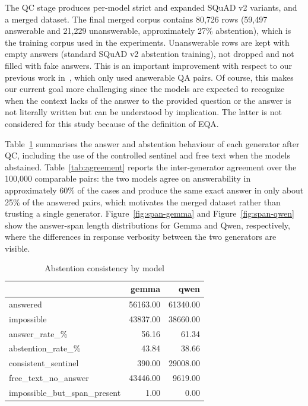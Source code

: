 \documentclass[graybox]{SNmult}
\begin{document}
The QC stage produces per-model strict and expanded SQuAD v2 variants, and a
merged dataset. The final merged corpus contains 80{,}726 rows (59{,}497
answerable and 21{,}229 unanswerable, approximately 27\% abstention), which is
the training corpus used in the experiments. Unanswerable rows are kept with
empty answers (standard SQuAD v2 abstention training), not dropped and not
filled with fake answers. This is an important improvement with
respect to our previous work in~\cite{falconi2026robberyqa}, which
only used answerable QA pairs. Of course, this makes our current goal
more challenging since the models are expected to recognize when the
context lacks of the answer to the provided question or the answer is
not literally written but can be understood by implication. The latter
is not considered for this study because of the definition of EQA.

Table~\ref{tab:abstention} summarises the answer and abstention behaviour of
each generator after QC, including the use of the controlled sentinel and free
text when the models abstained. Table~\ref{tab:agreement} reports the
inter-generator agreement over the 100{,}000 comparable pairs: the two models
agree on answerability in approximately 60\% of the cases and produce the same
exact answer in only about 25\% of the answered pairs, which motivates the
merged dataset rather than trusting a single generator. Figure~\ref{fig:span-gemma}
and Figure~\ref{fig:span-qwen} show the answer-span length distributions for
Gemma and Qwen, respectively, where the differences in response verbosity
between the two generators are visible.

\begin{table}[!t]
\caption{Abstention consistency by model}
\label{tab:abstention}
\begin{tabular}{lrr}
\toprule
 & gemma & qwen \\
\midrule
answered & 56163.00 & 61340.00 \\
impossible & 43837.00 & 38660.00 \\
answer\_rate\_\% & 56.16 & 61.34 \\
abstention\_rate\_\% & 43.84 & 38.66 \\
consistent\_sentinel & 390.00 & 29008.00 \\
free\_text\_no\_answer & 43446.00 & 9619.00 \\
impossible\_but\_span\_present & 1.00 & 0.00 \\
\bottomrule
\end{tabular}
\end{table}
\end{document}
